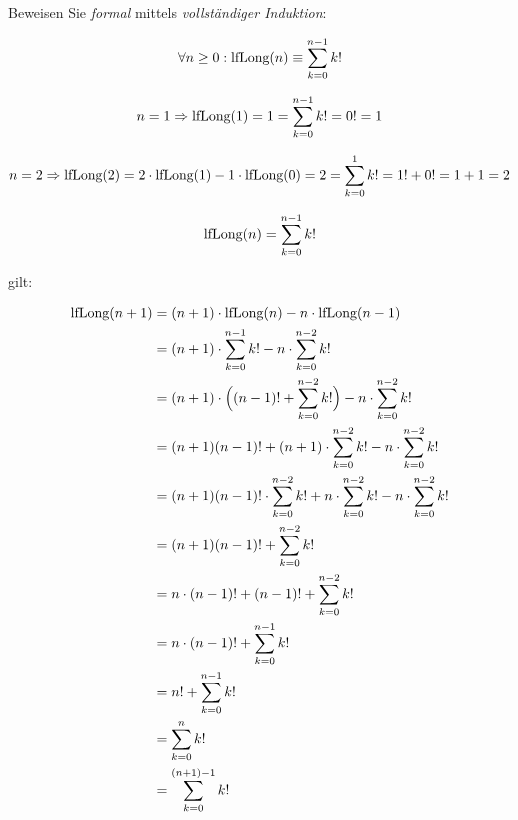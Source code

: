 \documentclass{lehramt-informatik-aufgabe}
\begin{document}
\begin{enumerate}

Beweisen Sie \emph{formal} mittels \emph{vollständiger Induktion}:

\begin{displaymath}
\forall n \geq 0: \text{lfLong}(n) \equiv \sum^{n-1}_{k=0}k!
\end{displaymath}

\begin{liAntwort}

%

\liInduktionAnfang

\begin{displaymath}
n=1 \Rightarrow
\text{lfLong}(1) =
1 =
\sum^{n-1}_{k=0}k! =
0! =
1
\end{displaymath}

\begin{displaymath}
n=2 \Rightarrow
\text{lfLong}(2) =
2 \cdot \text{lfLong}(1) - 1 \cdot \text{lfLong}(0) =
2 =
\sum^{1}_{k=0}k! =
1! + 0! =
1 + 1 =
2
\end{displaymath}

%

\liInduktionVoraussetzung

\begin{displaymath}
\text{lfLong}(n) = \sum^{n-1}_{k=0}k!
\end{displaymath}

gilt:

%

\liInduktionSchritt

\begin{equation}
\begin{split}
\text{lfLong}(n+1) & = (n+1) \cdot \text{lfLong}(n) - n \cdot \text{lfLong}(n-1) \\
& = (n+1) \cdot \sum^{n-1}_{k=0}k! - n \cdot \sum^{n-2}_{k=0}k! \\
& = (n+1) \cdot \Big((n-1)! + \sum^{n-2}_{k=0}k!\Big) - n \cdot \sum^{n-2}_{k=0}k! \\
& = (n+1)(n-1)! + (n+1) \cdot \sum^{n-2}_{k=0}k! - n \cdot \sum^{n-2}_{k=0}k! \\
& = (n+1)(n-1)! \cdot \sum^{n-2}_{k=0}k! + n \cdot \sum^{n-2}_{k=0}k! - n \cdot \sum^{n-2}_{k=0}k! \\
& = (n+1)(n-1)! + \sum^{n-2}_{k=0}k! \\
& = n \cdot (n-1)! + (n-1)! + \sum^{n-2}_{k=0}k! \\
& = n \cdot (n-1)! + \sum^{n-1}_{k=0}k! \\
& = n! + \sum^{n-1}_{k=0}k! \\
& = \sum^{n}_{k=0}k! \\
& = \sum^{(n+1)-1}_{k=0}k!
\end{split}
\end{equation}
\end{liAntwort}

\begin{liAntwort}

\end{liAntwort}

\end{enumerate}
\end{document}
